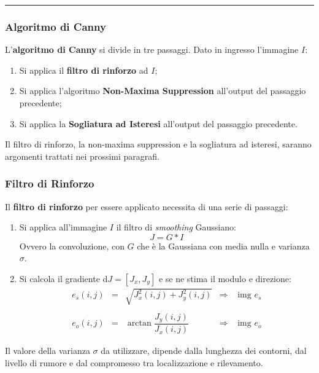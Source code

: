 \documentclass[a4paper]{article}
\newcommand{\longline}{\noindent\rule{\textwidth}{0.4pt}}
\begin{document}
	\longline

	\subsubsection{Algoritmo di Canny}
	
	L'\textcolor{Red3}{\textbf{algoritmo di Canny}} si divide in tre passaggi. Dato in ingresso l'immagine $I$:
	\begin{enumerate}
		\item Si applica il \textbf{filtro di rinforzo} ad $I$;
		\item Si applica l'algoritmo \textbf{Non-Maxima Suppression} all'output del passaggio precedente;
		\item Si applica la \textbf{Sogliatura ad Isteresi} all'output del passaggio precedente.
	\end{enumerate}
	Il filtro di rinforzo, la non-maxima suppression e la sogliatura ad isteresi, saranno argomenti trattati nei prossimi paragrafi.
	
	\subsubsection{Filtro di Rinforzo}
	
	Il \textcolor{Red3}{\textbf{filtro di rinforzo}} per essere applicato necessita di una serie di passaggi:
	\begin{enumerate}
		\item Si applica all'immagine $I$ il filtro di \emph{smoothing} Gaussiano:
		\begin{equation*}
			J = G * I
		\end{equation*}
		Ovvero la convoluzione, con $G$ che è la Gaussiana con media nulla e varianza $\sigma$.
		
		\item Si calcola il gradiente $\mathrm{d}J = \left[J_{x}, J_{y}\right]$ e se ne stima il modulo e direzione:
		\begin{equation*}
			\begin{array}{lllll}
				e_{s}\left(i,j\right) & = & \sqrt{J^{2}_{x}\left(i,j\right) + J^{2}_{y}\left(i,j\right)} & \Longrightarrow & \text{ img } e_{s} \\
				&&&& \\
				e_{o}\left(i,j\right) & = & \arctan\dfrac{J_{y}\left(i,j\right)}{J_{x}\left(i,j\right)} & \Longrightarrow & \text{ img } e_{o}
			\end{array}
		\end{equation*}
	\end{enumerate}
	Il valore della varianza $\sigma$ da utilizzare, dipende dalla lunghezza dei contorni, dal livello di rumore e dal compromesso tra localizzazione e rilevamento.\newline
	
\end{document}
